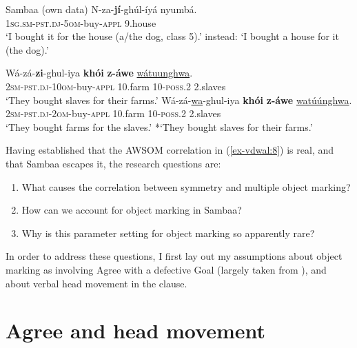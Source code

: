 \documentclass[output=paper
,modfonts
,nonflat]{langsci/langscibook}
\begin{document}
\begin{exe} \settowidth{}
\ex Sambaa (own data) \label{ex-vdwal:10} \newline
	\gll N-za-\textbf{jí}-ghúl-íyá nyumbá.\\
		\textsc{1sg.sm-pst.dj-5om}-buy-\textsc{appl} 9.house\\
	\glt *`I bought it for the house (a/the dog, class 5).' 
	instead: `I bought a house for it (the dog).' 
\end{exe}\largerpage[-2]\pagebreak

\begin{exe} \settowidth{}
\ex \label{ex-vdwal:11}
	\xlist
	\ex
		\gll Wá-zá-\textbf{zi}-ghul-iya \textbf{khói} \textbf{z-áwe} \uline{wátuunghwa}.\\
		\textsc{2sm-pst.dj-10om}-buy-\textsc{appl} 10.farm 10-\textsc{poss}.2 2.slaves\\
		\glt `They bought slaves for their farms.' 
	\ex 
		\gll Wá-zá-\uline{wa}-ghul-iya \textbf{khói} \textbf{z-áwe} \uline{watúúnghwa}.\\
		\textsc{2sm-pst.dj-2om}-buy-\textsc{appl} 10.farm 10-\textsc{poss}.2 2.slaves\\
		\glt `They bought farms for the slaves.'      
		*`They bought slaves for their farms.'  
	\endxlist
\end{exe}
Having established that the AWSOM correlation in (\ref{ex-vdwal:8}) is real, and that Sambaa escapes it, the research questions are:

\begin{enumerate}\label{vdw:researchquestions}
\item What causes the correlation between symmetry and multiple object marking?
\item How can we account for object marking in Sambaa?
\item Why is this parameter setting for object marking so apparently rare?
\end{enumerate}
In order to address these questions, I first lay out my assumptions about object marking as involving Agree with a defective Goal (largely taken from \citealt{Van_der_Wal2015}), and about verbal head movement in the clause.

\section{Agree and head movement}\label{sec-vdwal:4}
\end{document}

